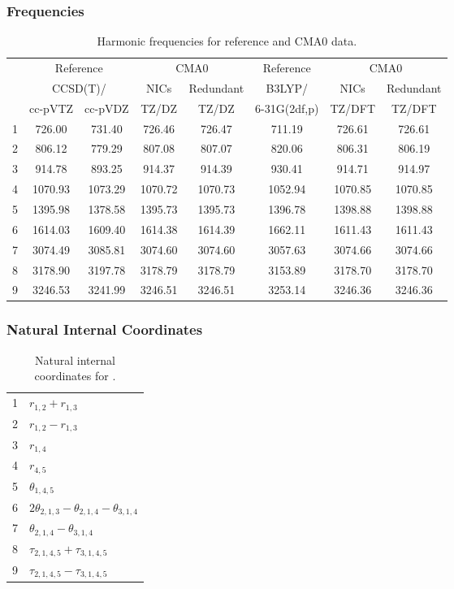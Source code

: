 \documentclass[10pt,oneside]{article}
\begin{document}
\begin{table}[h!]
\subsubsection*{Frequencies}
\centering
\caption{Harmonic frequencies for reference and CMA0 data.}
\begin{tabular}{cccccccc}
\toprule
{} & \multicolumn{2}{c}{Reference} & \multicolumn{2}{c}{CMA0} &    Reference & \multicolumn{2}{c}{CMA0} \\
{} & \multicolumn{2}{c}{CCSD(T)/} &    NICs &  Redundant &       B3LYP/ &    NICs & Redundant \\
{} &   cc-pVTZ & cc-pVDZ &   TZ/DZ &      TZ/DZ & 6-31G(2df,p) &  TZ/DFT &    TZ/DFT \\
\midrule
1 &    726.00 &  731.40 &  726.46 &     726.47 &       711.19 &  726.61 &    726.61 \\
2 &    806.12 &  779.29 &  807.08 &     807.07 &       820.06 &  806.31 &    806.19 \\
3 &    914.78 &  893.25 &  914.37 &     914.39 &       930.41 &  914.71 &    914.97 \\
4 &   1070.93 & 1073.29 & 1070.72 &    1070.73 &      1052.94 & 1070.85 &   1070.85 \\
5 &   1395.98 & 1378.58 & 1395.73 &    1395.73 &      1396.78 & 1398.88 &   1398.88 \\
6 &   1614.03 & 1609.40 & 1614.38 &    1614.39 &      1662.11 & 1611.43 &   1611.43 \\
7 &   3074.49 & 3085.81 & 3074.60 &    3074.60 &      3057.63 & 3074.66 &   3074.66 \\
8 &   3178.90 & 3197.78 & 3178.79 &    3178.79 &      3153.89 & 3178.70 &   3178.70 \\
9 &   3246.53 & 3241.99 & 3246.51 &    3246.51 &      3253.14 & 3246.36 &   3246.36 \\
\bottomrule
\end{tabular}
\end{table}

\begin{table}[h!]
\subsubsection*{Natural Internal Coordinates}
\centering
\caption{Natural internal coordinates for .}
\small
\begin{tabular}{ll}
\toprule
  1   & $r_{1,2} + r_{1,3}$ \\
  2   & $r_{1,2} - r_{1,3}$ \\
  3   & $r_{1,4}$ \\
  4   & $r_{4,5}$ \\
  5   & $\theta_{1,4,5}$ \\
  6   & $2\theta_{2,1,3} - \theta_{2,1,4} - \theta_{3,1,4}$ \\
  7   & $\theta_{2,1,4} - \theta_{3,1,4}$ \\
  8   & $\tau_{2,1,4,5} + \tau_{3,1,4,5}$ \\
  9   & $\tau_{2,1,4,5} - \tau_{3,1,4,5}$ \\
\bottomrule
\end{tabular}
\end{table}
\end{document}
